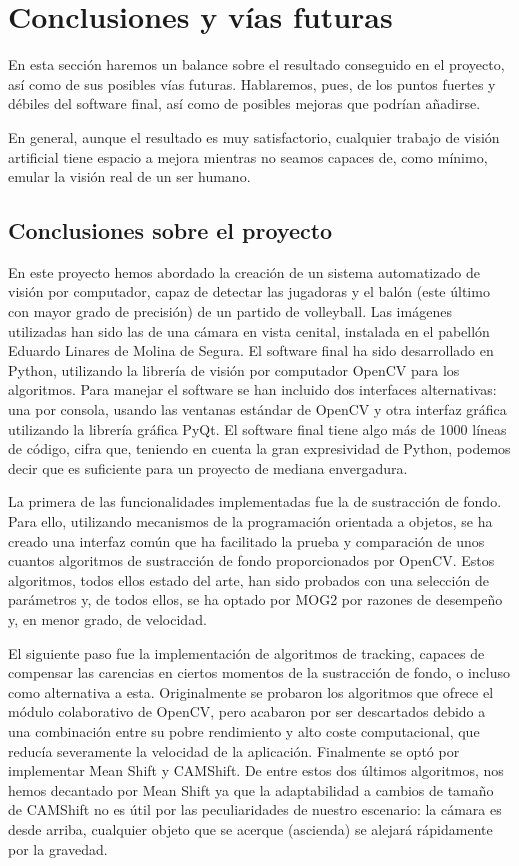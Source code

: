 \section{Conclusiones y vías futuras}
En esta sección haremos un balance sobre el resultado conseguido en el proyecto, así como de sus posibles vías futuras. Hablaremos, pues, de los puntos fuertes y débiles del software final, así como de posibles mejoras que podrían añadirse. 

En general, aunque el resultado es muy satisfactorio, cualquier trabajo de visión artificial tiene espacio a mejora mientras no seamos capaces de, como mínimo, emular la visión real de un ser humano.

\subsection{Conclusiones sobre el proyecto}
En este proyecto hemos abordado la creación de un sistema automatizado de visión por computador, capaz de detectar las jugadoras y el balón (este último con mayor grado de precisión) de un partido de volleyball. Las imágenes utilizadas han sido las de una cámara en vista cenital, instalada en el pabellón Eduardo Linares de Molina de Segura. El software final ha sido desarrollado en Python, utilizando la librería de visión por computador OpenCV para los algoritmos. Para manejar el software se han incluido dos interfaces alternativas: una por consola, usando las ventanas estándar de OpenCV y otra interfaz gráfica utilizando la librería gráfica PyQt. El software final tiene algo más de 1000 líneas de código, cifra que, teniendo en cuenta la gran expresividad de Python, podemos decir que es suficiente para un proyecto de mediana envergadura.

La primera de las funcionalidades implementadas fue la de sustracción de fondo. Para ello, utilizando mecanismos de la programación orientada a objetos, se ha creado una interfaz común que ha facilitado la prueba y comparación de unos cuantos algoritmos de sustracción de fondo proporcionados por OpenCV. Estos algoritmos, todos ellos estado del arte, han sido probados con una selección de parámetros y, de todos ellos, se ha optado por MOG2 por razones de desempeño y, en menor grado, de velocidad.

El siguiente paso fue la implementación de algoritmos de tracking, capaces de compensar las carencias en ciertos momentos de la sustracción de fondo, o incluso como alternativa a esta. Originalmente se probaron los algoritmos que ofrece el módulo colaborativo de OpenCV, pero acabaron por ser descartados debido a una combinación entre su pobre rendimiento y alto coste computacional, que reducía severamente la velocidad de la aplicación. Finalmente se optó por implementar Mean Shift y CAMShift. De entre estos dos últimos algoritmos, nos hemos decantado por Mean Shift ya que la adaptabilidad a cambios de tamaño de CAMShift no es útil por las peculiaridades de nuestro escenario: la cámara es desde arriba, cualquier objeto que se acerque (ascienda) se alejará rápidamente por la gravedad.

